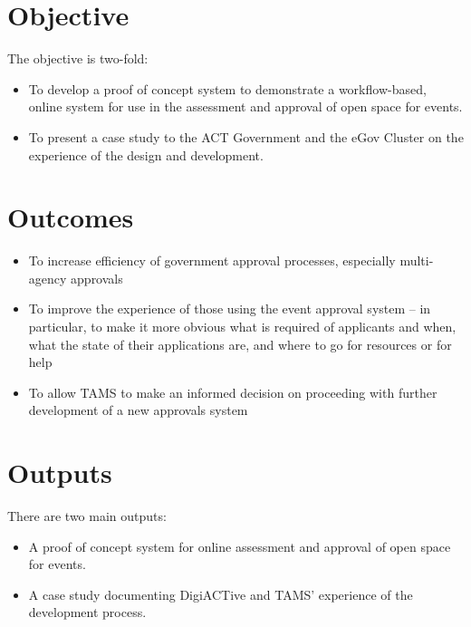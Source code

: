 \documentclass[12pt,a4paper,twosided]{article}
\begin{document}
\section{Objective}\label{objective}

The objective is two-fold:

\begin{itemize}
\itemsep1pt\parskip0pt
\item
  To develop a proof of concept system to demonstrate a workflow-based,
  online system for use in the assessment and approval of open space for
  events.
\item
  To present a case study to the ACT Government and the eGov Cluster on
  the experience of the design and development.
\end{itemize}

\section{Outcomes}\label{outcomes}

\begin{itemize}
\itemsep1pt\parskip0pt
\item
  To increase efficiency of government approval processes, especially
  multi-agency approvals
\item
  To improve the experience of those using the event approval system --
  in particular, to make it more obvious what is required of applicants
  and when, what the state of their applications are, and where to go
  for resources or for help
\item
  To allow TAMS to make an informed decision on proceeding with further
  development of a new approvals system
\end{itemize}

\section{Outputs}\label{outputs}

There are two main outputs:

\begin{itemize}
\itemsep1pt\parskip0pt
\item
  A proof of concept system for online assessment and approval of open
  space for events.
\item
  A case study documenting DigiACTive and TAMS' experience of the
  development process.
\end{itemize}
\end{document}
